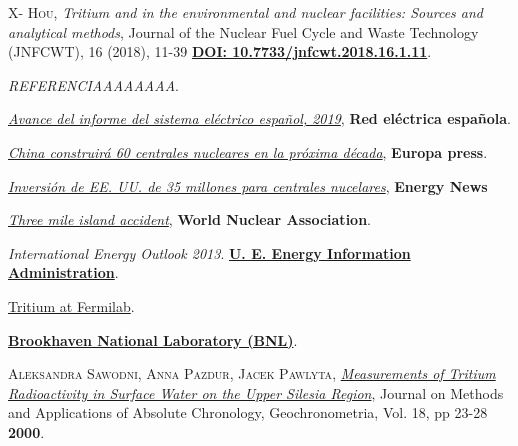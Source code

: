 \begin{thebibliography}{100}
 \textsc{X- Hou},  
\textit{Tritium and  in the environmental and nuclear facilities: Sources and analytical methods}, Journal of the Nuclear Fuel Cycle and Waste Technology (JNFCWT), 16 (2018), 11-39 \href{https://doi.org/10.7733/jnfcwt.2018.16.1.11}{\textbf{DOI: 10.7733/jnfcwt.2018.16.1.11}}.

\textit{REFERENCIAAAAAAAA}.

\href{https://www.ree.es/es/datos/publicaciones/informe-anual-sistema/informe-del-sistema-electrico-espanol-2019}{\textit{Avance del informe del sistema eléctrico español, 2019}}, 
\textbf{Red eléctrica española}.

\href{https://www.europapress.es/internacional/noticia-china-construira-menos-60-centrales-nucleares-proxima-decada-20160916210159.html}{\textit{China construirá 60 centrales nucleares en la próxima década}}, 
\textbf{Europa press}.

\href{https://www.energynews.es/estados-unidos-centrales-nucleares/}{\textit{Inversión de EE. UU. de 35 millones para centrales nucelares}}, \textbf{Energy News}

\href{www.world-nuclear.org/information-library/safety-and-security/safety-of-plants/three-mile-island-accident.aspx}{\textit{Three mile island accident}}, \textbf{World Nuclear Association}.

\textit{International Energy Outlook 2013}. \href{https://www.eia.gov/outlooks/ieo/}{\textbf{U. E. Energy Information Administration}}.

\href{https://www.fnal.gov/pub/tritium/}{Tritium at Fermilab}.

\href{https://www.bnl.gov/hfbr/decommission.php}{\textbf{Brookhaven National Laboratory (BNL)}}.

 \textsc{Aleksandra Sawodni}, \textsc{Anna Pazdur}, \textsc{Jacek Pawlyta}, 
\href{http://yadda.icm.edu.pl/baztech/element/bwmeta1.element.baztech-article-BAT3-0035-0005}{\textit{Measurements of Tritium Radioactivity in Surface Water on the Upper Silesia Region}}, Journal on Methods and Applications of Absolute Chronology, Geochronometria, Vol. 18, pp 23-28 \textbf{2000}.


\end{thebibliography}
